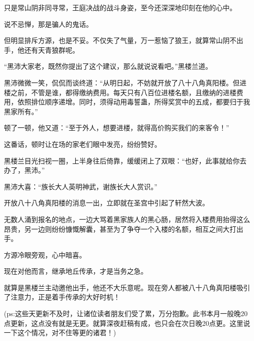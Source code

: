 \begin{this_body}
只是常山阴非同寻常，王庭决战的战斗身姿，至今还深深地印刻在他的心中。

说不忌惮，那是骗人的鬼话。

但明显排斥方源，也是不妥。不仅失了气量，万一惹恼了狼王，就算常山阴不出手，他还有天青狼群呢。

“黑沛大家老，既然你提出了这个建议，那么就说说看吧。”黑楼兰道。

黑沛微微一笑，侃侃而谈终道：“从明日起，不妨就开放了八十八角真阳楼。但进楼之前，不管是谁，都得缴纳费用。每天只有八百位进楼名额，且缴纳的进楼费用，依照排位顺序递增。同时，须得动用毒誓蛊，所得奖赏中的五成，都要归于我黑家所有。”

顿了一顿，他又道：“至于外人，想要进楼，就得高价购买我们的来客令！”

这番话，顿时让在场的家老们眼中发亮，纷纷赞好。

黑楼兰目光扫视一圈，上半身往后倚靠，缓缓闭上了双眼：“也好，此事就给你去办了，黑沛。”

黑沛大喜：“族长大人英明神武，谢族长大人赏识。”

开放八十八角真阳楼的消息一出，立即就在圣宫中引起了轩然大波。

无数人涌到报名的地点，一边大骂着黑家族人的黑心肠，居然将入楼费用抬得这么昂贵，另一边则纷纷慷慨解囊，甚至为了争夺一个入楼的名额，相互之间大打出手。

方源冷眼旁观，心中暗喜。

现在对他而言，继承地丘传承，才是当务之急。

就算是黑楼兰主动邀他出手，他还不大乐意呢。现在旁人都被八十八角真阳楼吸引了注意力，正是着手传承的大好时机！

(ps:这些天更新不及时，让诸位读者朋友们受了累，万分抱歉。此书本月一般晚20点更新，这点没有就是无更。就算深夜赶稿有成，也只会在次日晚20点更。这里说一下这个情况，对不住等更的诸君！)

\end{this_body}

